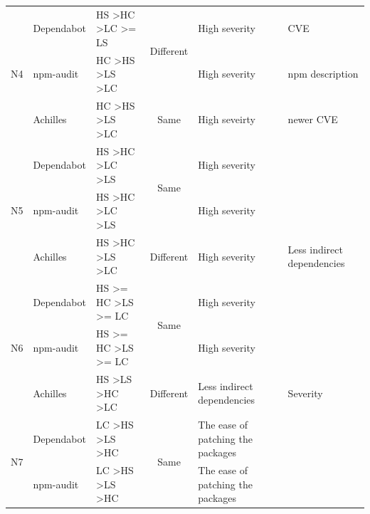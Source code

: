\documentclass[conference]{IEEEtran}
\begin{document}
\begin{table}[tb]
\begin{tabular}{|l|l|l|c|l|l|}
			\multirow{3}{*}{N4}  & Dependabot & HS \textgreater HC \textgreater LC \textgreater{}= LS       & \multirow{2}{*}{Different}      & High severity                     & CVE                        \\ \cline{2-3} \cline{5-6} 
			& npm-audit  & HC \textgreater HS \textgreater LS \textgreater LC          &                                 & High severity                     & npm description            \\ \cline{2-6} 
			& Achilles   & HC \textgreater HS \textgreater LS \textgreater LC          & Same                            & High seveirty                     & newer CVE                  \\ \hline
			\multirow{3}{*}{N5}  & Dependabot & HS \textgreater HC \textgreater LC \textgreater LS          & \multirow{2}{*}{Same}           & High severity                     &                            \\ \cline{2-3} \cline{5-6} 
			& npm-audit  & HS \textgreater HC \textgreater LC \textgreater LS          &                                 & High severity                     &                            \\ \cline{2-6} 
			& Achilles   & HS \textgreater HC \textgreater LS \textgreater LC          & Different                       & High severity                     & Less indirect dependencies \\ \hline
			\multirow{3}{*}{N6}  & Dependabot & HS \textgreater{}= HC \textgreater LS \textgreater{}= LC    & \multirow{2}{*}{Same}           & High severity                     &                            \\ \cline{2-3} \cline{5-6} 
			& npm-audit  & HS \textgreater{}= HC \textgreater LS \textgreater{}= LC    &                                 & High severity                     &                            \\ \cline{2-6} 
			& Achilles   & HS \textgreater LS \textgreater HC \textgreater LC          & Different                       & Less indirect dependencies        & Severity                   \\ \hline
			\multirow{3}{*}{N7}  & Dependabot & LC \textgreater HS \textgreater LS \textgreater HC          & \multirow{3}{*}{Same}           & The ease of patching the packages &                            \\ \cline{2-3} \cline{5-6} 
			& npm-audit  & LC \textgreater HS \textgreater LS \textgreater HC          &                                 & The ease of patching the packages &                            \\ \cline{2-3} \cline{5-6} 

\end{tabular}
\end{table}
\end{document}
